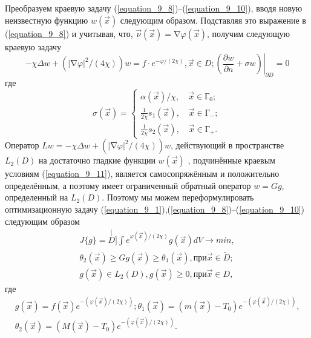 Преобразуем краевую задачу (\ref{equation_9_8})--(\ref{equation_9_10}), вводя новую неизвестную функцию $w(\vec x)$ следующим образом. Подставляя это выражение в (\ref{equation_9_8}) и учитывая, что, $\vec\nu(\vec x){=}\mathop{\nabla}\varphi(\vec x)$, получим следующую краевую задачу
         \begin{equation} \label{equation_9_11}
        -\chi\Delta w+\left(\left|\mathop{\nabla}\varphi\right|^2/(4\chi) \right)w=f\cdot e^{-\varphi/(2\chi)},\vec x{\in} D;\left.\left(\frac{\partial w}{\partial n}+\sigma w\right)\right|_{\partial D}{=}0
         \end{equation}
где
        \begin{equation*}
        \sigma(\vec{x})=
        \begin{cases}
        \displaystyle\alpha(\vec x)/\chi,\quad\vec x\in Г_0;\\
        \displaystyle\left.\frac{1}{2\chi}s_1(\vec x),\right.\quad\vec x\in Г_-;\\
        \displaystyle\left.\frac{1}{2\chi}s_2(\vec x),\right.\quad\vec x\in Г_+.
        \end{cases}
        \end{equation*}
Оператор $Lw{=}-\chi\Delta w{+}\left(\left|\mathop{\nabla}\varphi\right|^2/(4\chi)\right)w$, действующий в пространстве $L_2(D)$ на достаточно гладкие функции $w(\vec x)$ , подчинённые краевым условиям (\ref{equation_9_11}), является самосопряжённым и положительно определённым, а поэтому имеет ограниченный обратный оператор $w=Gg$, определенный на $L_2(D)$. Поэтому мы можем переформулировать оптимизационную задачу (\ref{equation_9_1}),(\ref{equation_9_8})--(\ref{equation_9_10}) следующим образом
        \begin{equation*}\begin{split}
        J\{g\}={\stackrel[D]{}{\int}}e^{\varphi(\vec x)/(2\chi)}g(\vec x)dV\rightarrow min,\\
        \theta_2(\vec x)\ge Gg(\vec x)\ge\theta_1(\vec x),при\vec x\in \tilde D;\\
        g(\vec x)\in L_2(D), g(\vec x)\ge 0,при\vec x\in D,
         \end{split}\end{equation*}
где
            \begin{eqnarray*}
            &g(\vec x)=f(\vec x)e^{-(\varphi(\vec x)/(2\chi))};\theta_1(\vec x)=(m(\vec x)-T_0)e^{-(\varphi(\vec x)/(2\chi))},& \\
            &\theta_2(\vec x)=(M(\vec x)-T_0)e^{-(\varphi(\vec x)/(2\chi))}.&
            \end{eqnarray*}

